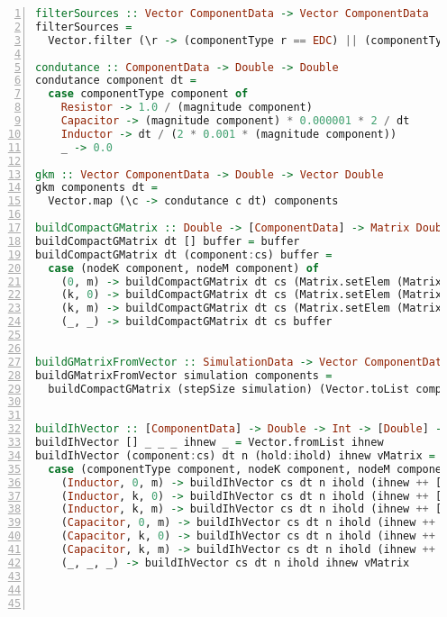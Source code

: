 \begin{lstlisting}[language=Haskell, numbers=left, caption={Main.hs file code}, captionpos=b, label={lst:maincompletecode}]
filterSources :: Vector ComponentData -> Vector ComponentData
filterSources =
  Vector.filter (\r -> (componentType r == EDC) || (componentType r == EAC))

condutance :: ComponentData -> Double -> Double
condutance component dt =
  case componentType component of
    Resistor -> 1.0 / (magnitude component)
    Capacitor -> (magnitude component) * 0.000001 * 2 / dt
    Inductor -> dt / (2 * 0.001 * (magnitude component))
    _ -> 0.0

gkm :: Vector ComponentData -> Double -> Vector Double
gkm components dt =
  Vector.map (\c -> condutance c dt) components

buildCompactGMatrix :: Double -> [ComponentData] -> Matrix Double -> Matrix Double
buildCompactGMatrix dt [] buffer = buffer
buildCompactGMatrix dt (component:cs) buffer =
  case (nodeK component, nodeM component) of 
    (0, m) -> buildCompactGMatrix dt cs (Matrix.setElem (Matrix.getElem m m buffer + condutance component dt) (m, m) buffer)
    (k, 0) -> buildCompactGMatrix dt cs (Matrix.setElem (Matrix.getElem k k buffer + condutance component dt) (k, k) buffer)
    (k, m) -> buildCompactGMatrix dt cs (Matrix.setElem (Matrix.getElem k k buffer + condutance component dt) (k, k) (Matrix.setElem (Matrix.getElem m m buffer + condutance component dt) (m, m) (Matrix.setElem (Matrix.getElem k m buffer - condutance component dt) (k, m) (Matrix.setElem (Matrix.getElem m k buffer - condutance component dt) (m, k) buffer))))
    (_, _) -> buildCompactGMatrix dt cs buffer


buildGMatrixFromVector :: SimulationData -> Vector ComponentData -> Matrix Double
buildGMatrixFromVector simulation components =
  buildCompactGMatrix (stepSize simulation) (Vector.toList components) (Matrix.zero (nodes simulation) (nodes simulation))


buildIhVector :: [ComponentData] -> Double -> Int -> [Double] -> [Double] -> Matrix Double -> Vector Double
buildIhVector [] _ _ _ ihnew _ = Vector.fromList ihnew
buildIhVector (component:cs) dt n (hold:ihold) ihnew vMatrix =
  case (componentType component, nodeK component, nodeM component) of 
    (Inductor, 0, m) -> buildIhVector cs dt n ihold (ihnew ++ [(2*(condutance component dt)*(Matrix.getElem m n vMatrix) + hold)]) vMatrix
    (Inductor, k, 0) -> buildIhVector cs dt n ihold (ihnew ++ [(-2*(condutance component dt)*(Matrix.getElem k n vMatrix) + hold)]) vMatrix
    (Inductor, k, m) -> buildIhVector cs dt n ihold (ihnew ++ [(-2*(condutance component dt)*((Matrix.getElem k n vMatrix) - (Matrix.getElem m n vMatrix)) + hold)]) vMatrix
    (Capacitor, 0, m) -> buildIhVector cs dt n ihold (ihnew ++ [(-2*(condutance component dt)*(Matrix.getElem m n vMatrix) - hold)]) vMatrix
    (Capacitor, k, 0) -> buildIhVector cs dt n ihold (ihnew ++ [(2*(condutance component dt)*(Matrix.getElem k n vMatrix) - hold)]) vMatrix
    (Capacitor, k, m) -> buildIhVector cs dt n ihold (ihnew ++ [(2*(condutance component dt)*((Matrix.getElem k n vMatrix) - (Matrix.getElem m n vMatrix)) - hold)]) vMatrix
    (_, _, _) -> buildIhVector cs dt n ihold ihnew vMatrix




\end{lstlisting}
